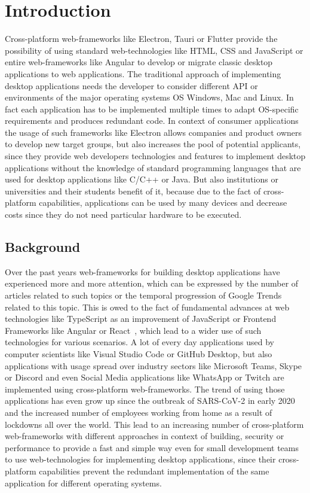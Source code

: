 \section{Introduction}\label{sec:introduction}
Cross-platform web-frameworks like Electron, Tauri or Flutter provide the possibility of using standard web-technologies like \ac{HTML}, \ac{CSS} and JavaScript or entire web-frameworks
like Angular to develop or migrate classic desktop applications to web applications.
The traditional approach of implementing desktop applications needs the developer to consider different \ac{API} or environments of the major operating systems \ac{OS}
Windows, Mac and Linux.
In fact each application has to be implemented multiple times to adapt \ac{OS}-specific requirements and produces redundant code.
In context of consumer applications the usage of such frameworks like Electron allows companies and product owners to develop new target groups, but also increases the pool of potential applicants,
since they provide web developers technologies and features to implement desktop applications without the knowledge of standard programming languages that are used for desktop applications
like C/C++ or Java.
But also institutions or universities and their students benefit of it, because due to the fact of cross-platform capabilities, applications can be used by many devices and decrease costs
since they do not need particular hardware to be executed.

\subsection{Background}\label{subsec:background}
Over the past years web-frameworks for building desktop applications have experienced more and more attention, which can be expressed by the number of articles related to such topics or the temporal progression of Google Trends related to this topic.
This is owed to the fact of fundamental advances at web technologies like TypeScript as an improvement of JavaScript or Frontend Frameworks like Angular or React~\cite{pernice:icalepcs2019-wempr006},
which lead to a wider use of such technologies for various scenarios.
A lot of every day applications used by computer scientists like Visual Studio Code or GitHub Desktop, but also applications with usage spread over industry sectors
like Microsoft Teams, Skype or Discord and even Social Media applications like WhatsApp or Twitch are implemented using cross-platform web-frameworks.
The trend of using those applications has even grow up since the outbreak of SARS-CoV-2 in early 2020~\cite{Gorbalenya2020} and the increased number of employees working from home
as a result of lockdowns all over the world.
This lead to an increasing number of cross-platform web-frameworks with different approaches in context of building, security or performance to provide a fast and simple way even for small development teams
to use web-technologies for implementing desktop applications, since their cross-platform capabilities prevent the redundant implementation of the same application for different operating systems.

